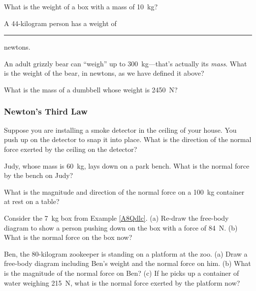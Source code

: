 \documentclass[]{article}
\begin{document}
\begin{exercise} \label{eStk9M}
What is the weight of a box with a mass of \SI{10}{kg}?
\end{exercise}

\begin{exercise} \label{x9Ufbz}
A 44-kilogram person has a weight of \rule{1cm}{0.15mm} newtons.
\end{exercise}

\begin{exercise} \label{r7dwXZ}
An adult grizzly bear can ``weigh'' up to \SI{300}{kg}---that's actually its \textit{mass}. What is the weight of the bear, in newtons, as we have defined it above?
\end{exercise}

\begin{exercise} \label{neLJbr}
What is the mass of a dumbbell whose weight is \SI{2450}{N}?
\end{exercise}

\subsubsection*{Newton's Third Law}

\begin{exercise} \label{f03y7Z}
    Suppose you are installing a smoke detector in the ceiling of your house. You push up on the detector to snap it into place. What is the direction of the normal force exerted by the ceiling on the detector?
\end{exercise}

\begin{exercise} \label{BkOxdJ}
Judy, whose mass is \SI{60}{kg}, lays down on a park bench. What is the normal force by the bench on Judy?
\end{exercise}


\begin{exercise} \label{QaZUiq}
What is the magnitude and direction of the normal force on a \SI{100}{kg} container at rest on a table?
\end{exercise}

\begin{exercise} \label{wkga6W}
Consider the \SI{7}{kg} box from Example \ref{A8Qdlc}. (a) Re-draw the free-body diagram to show a person pushing down on the box with a force of \SI{84}{N}. (b) What is the normal force on the box now?
\end{exercise}

\begin{exercise} \label{hIgPqQ}
Ben, the 80-kilogram zookeeper is standing on a platform at the zoo. (a) Draw a free-body diagram including Ben's weight and the normal force on him. (b) What is the magnitude of the normal force on Ben? (c) If he picks up a container of water weighing \SI{215}{N}, what is the normal force exerted by the platform now? 
\end{exercise}
\end{document}
